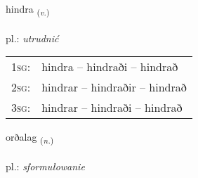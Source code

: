 \documentclass[frontgrid, backgrid]{flacards}\usepackage[]{graphicx}\usepackage[]{xcolor}
\begin{document}
\renewcommand{\flhead}{\vskip5pt \fboxsep=0pt {\small\bfseries\footnotesize Sagnorð | czasownik}}
\renewcommand{\fcfoot}{\vskip5pt \fboxsep=0pt \hspace{2pt}{\small\bfseries\footnotesize 3K}}

\renewcommand{\blhead}{\vskip5pt {\small\bfseries\footnotesize Sagnorð | czasownik }}
\renewcommand{\bcfoot}{\vskip5pt \hspace{2pt}{\small\bfseries\footnotesize 3K}}


{hindra \small{\textsubscript{(\textit{v.})}} \\[1ex] %
\textphonetic{[hɪntra]} \\
pl.: \emph{utrudnić} \\  [2ex]
\renewcommand*{\arraystretch}{0.8}
\begin{tabular}{p{1cm}l}
\textsc{1sg}: & hindra -- hindraði -- hindrað \\ 
\textsc{2sg}: & hindrar -- hindraðir -- hindrað \\ 
\textsc{3sg}: & hindrar -- hindraði -- hindrað \\ 
\end{tabular}
}

\renewcommand{\flhead}{\vskip5pt \fboxsep=0pt {\small\bfseries\footnotesize Nafnorð | rzeczownik}}
\renewcommand{\fcfoot}{\vskip5pt \fboxsep=0pt \hspace{2pt}{\small\bfseries\footnotesize 3K}}

\renewcommand{\blhead}{\vskip5pt {\small\bfseries\footnotesize Nafnorð | rzeczownik }}
\renewcommand{\bcfoot}{\vskip5pt \hspace{2pt}{\small\bfseries\footnotesize 3K}}


{orðalag \small{\textsubscript{(\textit{n.})}} \\[1ex] %
\textphonetic{[ɔrðalaɣ]} \\
pl.: \emph{sformułowanie} \\  [2ex]
\renewcommand*{\arraystretch}{0.8}
}
\end{document}
